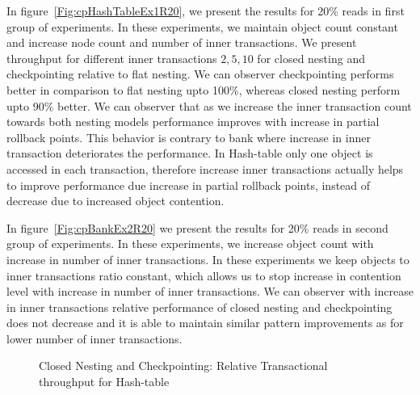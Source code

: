 \documentclass[12pt,english]{report}
\begin{document}
In figure~\ref{Fig:cpHashTableEx1R20}, we present the results for 20\% reads in first group of experiments. In these experiments, we maintain object count constant and increase node count and number of inner transactions. We present throughput for different inner transactions ${2, 5, 10}$ for closed nesting and checkpointing relative to flat nesting. We can observer checkpointing performs better in comparison to flat nesting upto 100\%, whereas closed nesting perform upto 90\% better. We can observer that as we increase the inner transaction count towards both nesting models performance improves with increase in partial rollback points. This behavior is contrary to bank where increase in inner transaction deteriorates the performance. In Hash-table only one object is accessed in each transaction, therefore increase inner transactions actually helps to improve performance due increase in partial rollback points, instead of decrease due to increased object contention.

In figure~\ref{Fig:cpBankEx2R20} we present the results for 20\% reads in second group of experiments. In these experiments, we increase object count with increase in number of inner transactions. In these experiments we keep objects to inner transactions ratio constant, which allows us to stop increase in contention level with increase in number of inner transactions. We can observer with increase in inner transactions relative performance of closed nesting and checkpointing does not decrease and it is able to maintain similar pattern improvements as for lower number of inner transactions.

\begin{figure}[H]
\centering
{}
\end{figure}
\begin{figure}[H]
\centering
{}
\end{figure}
\begin{figure}[H]
\centering
{}
\caption{Closed Nesting and Checkpointing: Relative Transactional throughput for Hash-table}
\label{Fig:cpHashTable}
\end{figure}
\end{document}
